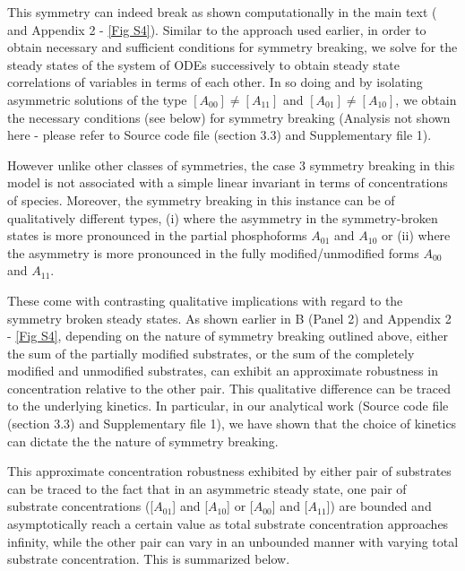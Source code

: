 \documentclass[9pt,lineno]{elife}
\begin{document}
\begin{appendixbox}
This symmetry can indeed break as shown computationally in the main text ( and Appendix 2 - \cref{Fig S4}). Similar to the approach used earlier, in order to obtain necessary and sufficient conditions for symmetry breaking, we solve for the steady states of the system of ODEs successively to obtain steady state correlations of variables in terms of each other. In so doing  and by isolating asymmetric solutions of the type $[A_{00}] \neq [A_{11}]$ and $[A_{01}] \neq [A_{10}]$, we obtain the necessary conditions (see below) for symmetry breaking (Analysis not shown here - please refer to Source code file (section 3.3) and Supplementary file 1). 

However unlike other classes of symmetries, the case 3 symmetry breaking in this model is not associated with a simple linear invariant in terms of concentrations of species.
Moreover, the symmetry breaking in this instance can be of qualitatively different types, 
(i) where the asymmetry in the symmetry-broken states is more pronounced in the partial phosphoforms $A_{01}$ and $A_{10}$ or
(ii) where the asymmetry is more pronounced in the fully modified/unmodified forms $A_{00}$ and $A_{11}$.



These come with contrasting qualitative implications with regard to the symmetry broken steady states. As shown earlier in B (Panel 2) and Appendix 2 - \cref{Fig S4}, depending on the nature of symmetry breaking outlined above, either the sum of the partially modified substrates, or the sum of the completely modified and unmodified substrates, can exhibit an approximate robustness in concentration relative to the other pair. This qualitative difference can be traced to the underlying kinetics. In particular, in our analytical work (Source code file (section 3.3) and Supplementary file 1), we have shown that the choice of kinetics can dictate the the nature of symmetry breaking.

This approximate concentration robustness exhibited by either pair of substrates can be traced to the fact that in an asymmetric steady state, one pair of substrate concentrations ([$A_{01}$] and [$A_{10}$] or [$A_{00}$] and [$A_{11}$]) are bounded and asymptotically reach a certain value as total substrate concentration approaches infinity, while the other pair can  vary  in an unbounded manner with varying total substrate concentration. This is summarized below. 


\end{appendixbox}
\end{document}

